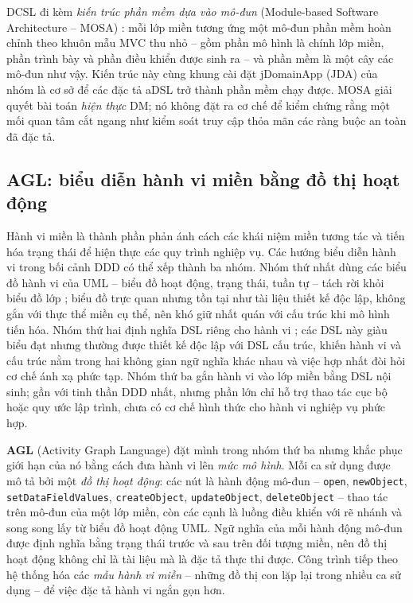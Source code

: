 DCSL đi kèm \emph{kiến trúc phần mềm dựa vào mô-đun} (Module-based Software Architecture -- MOSA) \cite{le2020}: mỗi lớp miền tương ứng một mô-đun phần mềm hoàn chỉnh theo khuôn mẫu MVC thu nhỏ -- gồm phần mô hình là chính lớp miền, phần trình bày và phần điều khiển được sinh ra -- và phần mềm là một cây các mô-đun như vậy. Kiến trúc này cùng khung cài đặt jDomainApp (JDA) của nhóm là cơ sở để các đặc tả aDSL trở thành phần mềm chạy được. MOSA giải quyết bài toán \emph{hiện thực} DM; nó không đặt ra cơ chế để kiểm chứng rằng một mối quan tâm cắt ngang như kiểm soát truy cập thỏa mãn các ràng buộc an toàn đã đặc tả.

\subsection{AGL: biểu diễn hành vi miền bằng đồ thị hoạt động}

Hành vi miền là thành phần phản ánh cách các khái niệm miền tương tác và tiến hóa trạng thái để hiện thực các quy trình nghiệp vụ. Các hướng biểu diễn hành vi trong bối cảnh DDD có thể xếp thành ba nhóm. Nhóm thứ nhất dùng các biểu đồ hành vi của UML -- biểu đồ hoạt động, trạng thái, tuần tự -- tách rời khỏi biểu đồ lớp \cite{omg2017uml}; biểu đồ trực quan nhưng tồn tại như tài liệu thiết kế độc lập, không gắn với thực thể miền cụ thể, nên khó giữ nhất quán với cấu trúc khi mô hình tiến hóa. Nhóm thứ hai định nghĩa DSL riêng cho hành vi \cite{voelter2013}; các DSL này giàu biểu đạt nhưng thường được thiết kế độc lập với DSL cấu trúc, khiến hành vi và cấu trúc nằm trong hai không gian ngữ nghĩa khác nhau và việc hợp nhất đòi hỏi cơ chế ánh xạ phức tạp. Nhóm thứ ba gắn hành vi vào lớp miền bằng DSL nội sinh; gần với tinh thần DDD nhất, nhưng phần lớn chỉ hỗ trợ thao tác cục bộ hoặc quy ước lập trình, chưa có cơ chế hình thức cho hành vi nghiệp vụ phức hợp.

\textbf{AGL} (Activity Graph Language) \cite{dang2023agl,le2023kse} đặt mình trong nhóm thứ ba nhưng khắc phục giới hạn của nó bằng cách đưa hành vi lên \emph{mức mô hình}. Mỗi ca sử dụng được mô tả bởi một \emph{đồ thị hoạt động}: các nút là hành động mô-đun -- \texttt{open}, \texttt{newObject}, \texttt{setDataFieldValues}, \texttt{createObject}, \texttt{updateObject}, \texttt{deleteObject} -- thao tác trên mô-đun của một lớp miền, còn các cạnh là luồng điều khiển với rẽ nhánh và song song lấy từ biểu đồ hoạt động UML. Ngữ nghĩa của mỗi hành động mô-đun được định nghĩa bằng trạng thái trước và sau trên đối tượng miền, nên đồ thị hoạt động không chỉ là tài liệu mà là đặc tả thực thi được. Công trình tiếp theo \cite{le2023kse} hệ thống hóa các \emph{mẫu hành vi miền} -- những đồ thị con lặp lại trong nhiều ca sử dụng -- để việc đặc tả hành vi ngắn gọn hơn.

